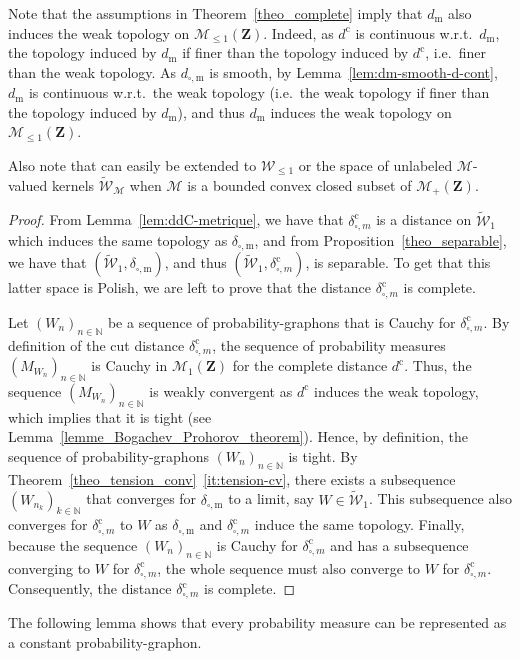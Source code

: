 \documentclass{amsart}
\newcommand{\wrt}{w.r.t.\ }
\newcommand{\ie}{i.e.\ }
\theoremstyle{plain}
\theoremstyle{definition}
\newcommand{\Space}{\mathbf{Z}}
\newcommand{\cm}{\mathcal{M}}
\newcommand{\cM}{\mathcal{M}}
\newcommand{\Proba}{\mathcal{M}_1(\Space)}
\newcommand{\SubProba}{\mathcal{M}_{\leq1}(\Space)}
\newcommand{\Meas}{\mathcal{M}_+(\Space)}
\newcommand{\SubGraphon}{\mathcal{W}_{\leq 1}}
\newcommand{\UGraphon}{\widetilde{\mathcal{W}}_1}
\newcommand{\UKernelM}{\widetilde{\mathcal{W}}_\cm}
\newcommand{\m}{\mathrm{m}}
\newcommand{\dmeas}{d_\m}
\newcommand{\dcut}{d_{\square,\m}}
\newcommand{\ddcut}{\delta_{\square,\m}}
\newcommand{\ccc}{\mathrm{c}}
\newcommand{\dmeasC}{d^\ccc}
\newcommand{\ddcutC}{\delta^\ccc_{\square, m}}
\newcommand{\N}{\mathbb{N}}
\begin{document}
Note that the assumptions in Theorem~\ref{theo_complete} imply
that   $\dmeas$  also induces  the  weak topology on $\SubProba$.
Indeed, as $\dmeasC$ is continuous \wrt  $\dmeas$, 
	the topology induced by $\dmeas$ if finer than the topology
	induced by $\dmeasC$, \ie finer than the weak topology.
As $\dcut$ is smooth, by Lemma~\ref{lem:dm-smooth-d-cont},
	$\dmeas$ is continuous \wrt the weak topology
	(\ie the weak topology if finer than the topology induced by $\dmeas$),
	and thus $\dmeas$ induces the weak topology on $\SubProba$.

Also note that  can easily be extended to $\SubGraphon$
or the space of unlabeled $\cM$-valued kernels $\UKernelM$
when $\cM$ is a bounded convex closed subset of $\Meas$.

\begin{proof}
  From Lemma~\ref{lem:ddC-metrique},  we have that $\ddcutC$  is a distance
  on $\UGraphon$ which  induces the same topology as  $\ddcut$, and from
  Proposition~\ref{theo_separable}, we have that $(\UGraphon,  \ddcut)$, and thus
  $(\UGraphon, \ddcutC)$, is separable.  To get that this latter space is
  Polish, we are left to prove  that the distance $\ddcutC$ is complete.
  \medskip


Let $(W_n )_{n\in\N}$ be a sequence of  probability-graphons that is
Cauchy for $\ddcutC$.  By definition  of the cut distance $\ddcutC$, the
sequence  of probability  measures $(M_{W_n}  )_{n\in\N}$ is  Cauchy in
$\Proba$ for  the complete distance  $\dmeasC$.  
Thus, the  sequence $(M_{W_n}  )_{n\in\N}$ is
weakly convergent as $\dmeasC$ induces the weak topology,
which implies that it is tight
	(see Lemma~\ref{lemme_Bogachev_Prohorov_theorem}).  
Hence, by definition,  the sequence of  probability-graphons $(W_n )_{n\in\N}$ is tight.  
By Theorem~\ref{theo_tension_conv}~\ref{it:tension-cv}, there exists a
subsequence $(W_{n_k} )_{k\in\N}$ that converges for $\ddcut$ to a limit,
say $W\in\UGraphon$.  This subsequence also  converges for $\ddcutC$  to 
$W$  as $\ddcut$  and $\ddcutC$  induce the  same topology.
Finally, because the sequence $(W_n )_{n\in\N}$ is Cauchy  for $\ddcutC$ and  has a
subsequence converging  to $W$  for $\ddcutC$,  the whole  sequence must
also  converge  to  $W$   for  $\ddcutC$.   Consequently,  the  distance
$\ddcutC$ is complete.
\end{proof}


The following lemma shows that every probability measure 
can be represented as a constant probability-graphon.
\end{document}
